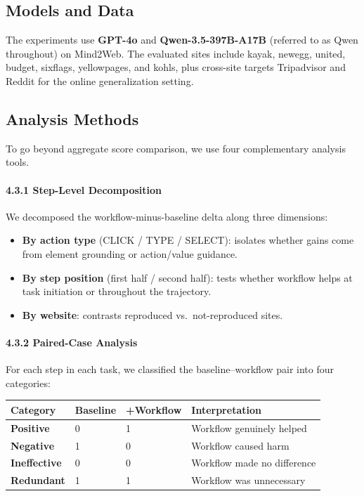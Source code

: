\documentclass{article}
\providecommand{\tightlist}{%
  \setlength{\itemsep}{0pt}\setlength{\parskip}{0.8em}}
\begin{document}
\subsection{Models and Data}\label{models-and-data}

The experiments use \textbf{GPT-4o} and \textbf{Qwen-3.5-397B-A17B}
(referred to as Qwen throughout) on Mind2Web. The evaluated sites
include kayak, newegg, united, budget, sixflags, yellowpages, and
kohls, plus cross-site targets Tripadvisor and Reddit for the online
generalization setting.

\subsection{Analysis Methods}\label{analysis-methods}

To go beyond aggregate score comparison, we use four complementary
analysis tools.

\paragraph{4.3.1 Step-Level
Decomposition}\label{step-level-decomposition}

We decomposed the workflow-minus-baseline delta along three dimensions:

\begin{itemize}
\tightlist
\item
  \textbf{By action type} (CLICK / TYPE / SELECT): isolates whether
  gains come from element grounding or action/value guidance.
\item
  \textbf{By step position} (first half / second half): tests whether
  workflow helps at task initiation or throughout the trajectory.
\item
  \textbf{By website}: contrasts reproduced vs.~not-reproduced sites.
\end{itemize}

\paragraph{4.3.2 Paired-Case Analysis}\label{paired-case-analysis}

For each step in each task, we classified the baseline--workflow pair
into four categories:

{\begin{longtable}[]{@{}llll@{}}
\toprule\noalign{}
Category & Baseline & +Workflow & Interpretation \\
\midrule\noalign{}
\endhead
\bottomrule\noalign{}
\endlastfoot
\textbf{Positive} & 0 & 1 & Workflow genuinely helped \\
\textbf{Negative} & 1 & 0 & Workflow caused harm \\
\textbf{Ineffective} & 0 & 0 & Workflow made no difference \\
\textbf{Redundant} & 1 & 1 & Workflow was unnecessary \\
\end{longtable}
}
\end{document}
